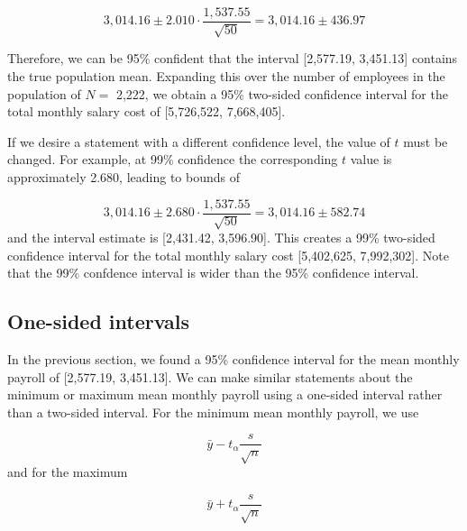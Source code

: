 \begin{equation*}
3,014.16 \pm 2.010 \cdot \frac{1,537.55}{\sqrt{50}} = 3,014.16 \pm 436.97
\end{equation*}


Therefore, we can be 95\% confident that the interval [2,577.19, 3,451.13] contains the true population mean. Expanding this over the number of employees in the population of $N =$ 2,222, we obtain a 95\% two-sided confidence interval for the total monthly salary cost of [5,726,522,\hspace{0.5em} 7,668,405].

\bigskip

If we desire a statement with a different confidence level, the value of $t$ must be changed. For example, at 99\% confidence the corresponding $t$ value is approximately 2.680, leading to bounds of 

\begin{equation*}
3,014.16 \pm 2.680 \cdot \frac{1,537.55}{\sqrt{50}} = 3,014.16 \pm 582.74
\end{equation*} 
and the interval estimate is [2,431.42,\hspace{0.5em} 3,596.90]. This creates a 99\% two-sided confidence interval for the total monthly salary cost [5,402,625, 7,992,302]. Note that the 99\% confdence interval is wider than the 95\% confidence interval.


\subsection{One-sided intervals} %
\label{sub:one_sided_intervals}

In the previous section, we found a 95\% confidence interval for the mean monthly payroll of [2,577.19,\hspace{0.5em} 3,451.13]. We can make similar statements about the minimum or maximum mean monthly payroll using a one-sided interval rather than a two-sided interval. For the minimum mean monthly payroll, we use

\begin{equation}
  \bar{y} - t_{\alpha} \frac{s}{\sqrt{n}}
\end{equation}
and for the maximum 

\begin{equation}
  \bar{y} + t_{\alpha} \frac{s}{\sqrt{n}}
\end{equation}

